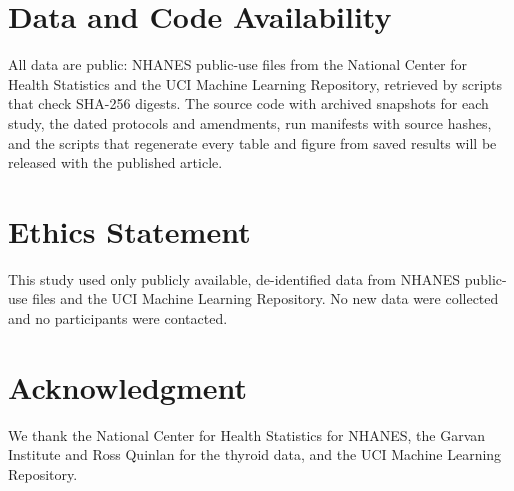 \documentclass[conference]{IEEEtran}
\begin{document}
\section*{Data and Code Availability}

All data are public: NHANES public-use files from the National Center for Health Statistics and the UCI Machine Learning Repository, retrieved by scripts that check SHA-256 digests. The source code with archived snapshots for each study, the dated protocols and amendments, run manifests with source hashes, and the scripts that regenerate every table and figure from saved results will be released with the published article.

\section*{Ethics Statement}

This study used only publicly available, de-identified data from NHANES public-use files and the UCI Machine Learning Repository. No new data were collected and no participants were contacted.

\section*{Acknowledgment}

We thank the National Center for Health Statistics for NHANES, the Garvan Institute and Ross Quinlan for the thyroid data, and the UCI Machine Learning Repository.
\end{document}
